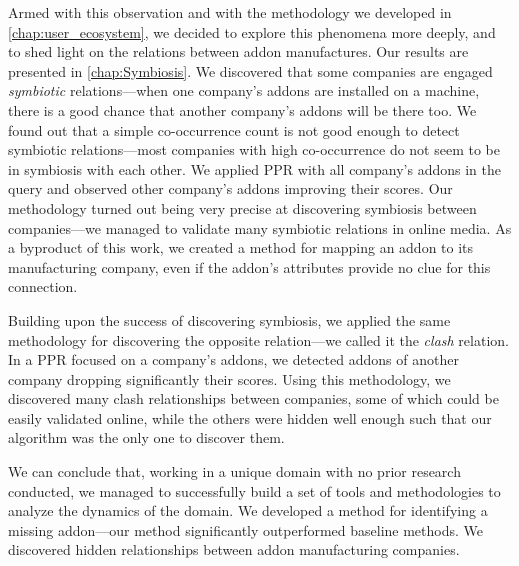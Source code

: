\documentclass[11pt,oneside]{book}
\begin{document}
Armed with this observation and with the methodology we developed in \autoref{chap:user_ecosystem}, we decided to explore this phenomena more deeply, and to shed light on the relations between addon manufactures. Our results are presented in \autoref{chap:Symbiosis}.
We discovered that some companies are engaged \emph{symbiotic} relations---when one company's addons are installed on a machine, there is a good chance that another company's addons will be there too. We found out that a simple co-occurrence count is not good enough to detect symbiotic relations---most companies with high co-occurrence do not seem to be in symbiosis with each other. We applied PPR with all company's addons in the query and observed other company's addons improving their scores. Our methodology turned out being very precise at discovering symbiosis between companies---we managed to validate many symbiotic relations in online media. As a byproduct of this work, we created a method for mapping an addon to its manufacturing company, even if the addon's attributes provide no clue for this connection.

Building upon the success of discovering symbiosis, we applied the same methodology for discovering the opposite relation---we called it the \emph{clash} relation. In a PPR focused on a company's addons, we detected addons of another company dropping significantly their scores. Using this methodology, we discovered many clash relationships between companies, some of which could be easily validated online, while the others were hidden well enough such that our algorithm was the only one to discover them.

We can conclude that, working in a unique domain with no prior research conducted, we managed to successfully build a set of tools and methodologies to analyze the dynamics of the domain.
We developed a method for identifying a missing addon---our method significantly outperformed baseline methods.
We discovered hidden relationships between addon manufacturing companies.



%
\iffalse
\newpage
\appendix
\chapter{} 
\renewcommand{\figurename}{Appendix}
\end{document}
